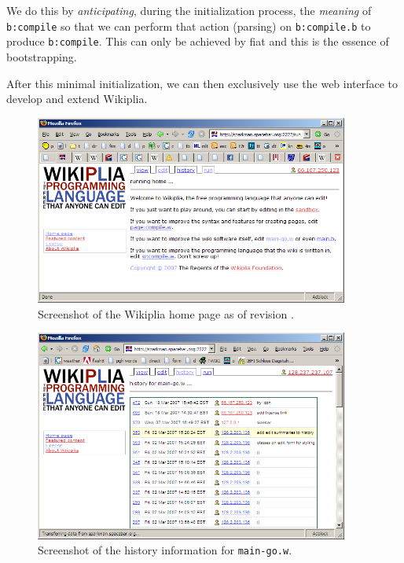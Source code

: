 \documentclass[twocolumn]{article}
\begin{document}
We do this by {\em anticipating}, during the initialization process,
the {\em meaning} of {\tt b:compile} so that we can perform that
action (parsing) on {\tt b:compile.b} to produce {\tt b:compile}. This
can only be achieved by fiat and this is the essence of bootstrapping.

After this minimal initialization, we can then exclusively use the web
interface to develop and extend Wikiplia.

\begin{figure}[t]
\begin{center}
\includegraphics[width=0.92\textwidth]{ss_homepage}
\end{center}
\caption{Screenshot of the Wikiplia home page as of revision
\currentrevision.} \label{fig:sshomepage}
\end{figure}

\begin{figure}[t]
\begin{center}
\includegraphics[width=0.92\textwidth]{ss_history}
\end{center}
\caption{Screenshot of the history information for {\tt main-go.w}.
} \label{fig:sshistory}
\end{figure}
\end{document}
